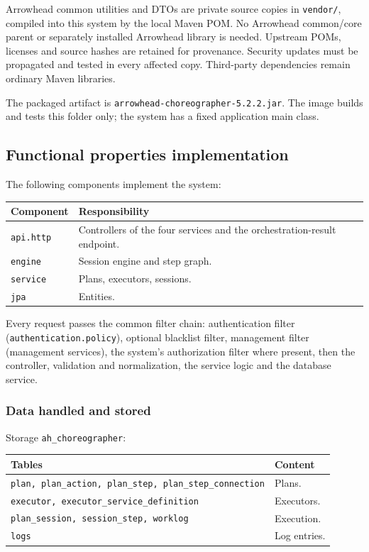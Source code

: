 \documentclass[a4paper]{arrowhead}
\begin{document}
Arrowhead common utilities and DTOs are private source copies in \texttt{vendor/}, compiled into this system by the local Maven POM. No Arrowhead common/core parent or separately installed Arrowhead library is needed. Upstream POMs, licenses and source hashes are retained for provenance. Security updates must be propagated and tested in every affected copy. Third-party dependencies remain ordinary Maven libraries.

The packaged artifact is \texttt{arrowhead-\allowbreak{}choreographer-5.2.2.jar}. The image builds and tests this folder only; the system has a fixed application main class.

\subsection{Functional properties implementation}

The following components implement the system:

\noindent\begin{longtable}{| p{5.6cm} | p{9.6cm} |} \hline
\rowcolor{gray!33} Component & Responsibility \\ \hline \endhead
\texttt{api.\allowbreak{}http} & Controllers of the four services and the orchestration-result endpoint. \\ \hline
\texttt{engine} & Session engine and step graph. \\ \hline
\texttt{service} & Plans, executors, sessions. \\ \hline
\texttt{jpa} & Entities. \\ \hline
\end{longtable}

Every request passes the common filter chain: authentication filter (\texttt{authentication.\allowbreak{}policy}), optional blacklist filter, management filter (management services), the system's authorization filter where present, then the controller, validation and normalization, the service logic and the database service.

\subsubsection{Data handled and stored}

Storage \texttt{ah\_\allowbreak{}choreographer}:

\noindent\begin{longtable}{| p{6.4cm} | p{8.8cm} |} \hline
\rowcolor{gray!33} Tables & Content \\ \hline \endhead
\texttt{plan,\allowbreak{} plan\_\allowbreak{}action,\allowbreak{} plan\_\allowbreak{}step,\allowbreak{} plan\_\allowbreak{}step\_\allowbreak{}connection} & Plans. \\ \hline
\texttt{executor,\allowbreak{} executor\_\allowbreak{}service\_\allowbreak{}definition} & Executors. \\ \hline
\texttt{plan\_\allowbreak{}session,\allowbreak{} session\_\allowbreak{}step,\allowbreak{} worklog} & Execution. \\ \hline
\texttt{logs} & Log entries. \\ \hline
\end{longtable}
\end{document}
